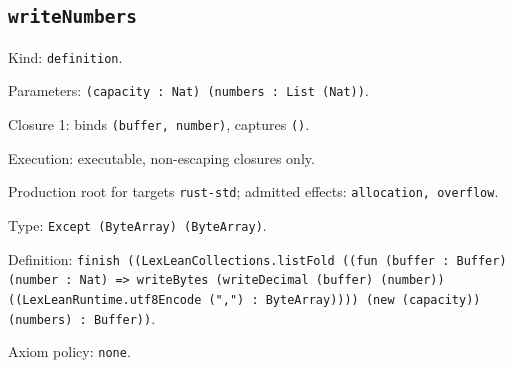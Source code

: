 \documentclass[11pt]{article}
\begin{document}
\subsection*{\texttt{writeNumbers}}
\noindent Kind: \texttt{definition}.\par
\noindent Parameters: \texttt{(capacity : Nat) (numbers : List (Nat))}.\par
\noindent Closure 1: binds \texttt{(buffer, number)}, captures \texttt{()}.\par
\noindent Execution: executable, non-escaping closures only.\par
\noindent Production root for targets \texttt{rust-std}; admitted effects: \texttt{allocation, overflow}.\par
\noindent Type: \texttt{Except (ByteArray) (ByteArray)}.\par
\noindent Definition: \texttt{finish ((LexLeanCollections.listFold ((fun (buffer : Buffer) (number : Nat) => writeBytes (writeDecimal (buffer) (number)) ((LexLeanRuntime.utf8Encode (",") : ByteArray)))) (new (capacity)) (numbers) : Buffer))}.\par
\noindent Axiom policy: \texttt{none}.\par
\end{document}

